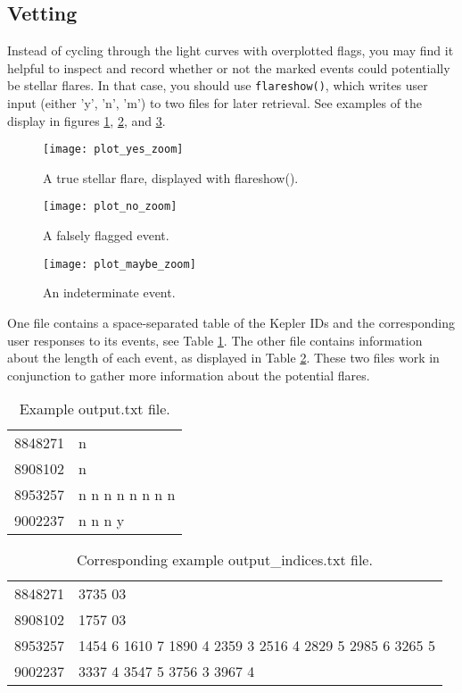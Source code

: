 \documentclass[11pt]{article}
\begin{document}
\subsection{Vetting}
\label{sec:vet}

Instead of cycling through the light curves with overplotted flags,
you may find it helpful to inspect and record whether or not the
marked events could potentially be stellar flares.  In that case, you
should use \verb|flareshow()|, which writes user input (either 'y',
'n', 'm') to two files for later retrieval.  See examples of the
display in figures \ref{fig:yes}, \ref{fig:no}, and \ref{fig:maybe}.
\begin{figure}[h!]
  \caption{A true stellar flare, displayed with flareshow().}
  \label{fig:yes}
  \centering
    \texttt{[image: plot\_yes\_zoom]}
\end{figure}

\begin{figure}[h!]
  \caption{A falsely flagged event.}
  \label{fig:no}
  \centering
    \texttt{[image: plot\_no\_zoom]}
\end{figure}

\begin{figure}[h!]
  \caption{An indeterminate event.}
  \label{fig:maybe}
  \centering
    \texttt{[image: plot\_maybe\_zoom]}
\end{figure}

One file contains a space-separated table of the Kepler IDs and the
corresponding user responses to its events, see Table
\ref{tab:output}.  The other file contains information about the
length of each event, as displayed in Table \ref{tab:outputindices}.
These two files work in conjunction to gather more information about
the potential flares.
\begin{table}[h]
  \centering
  \begin{tabular}{l l}
    8848271 &  n \\
    8908102 &  n \\
    8953257 &  n  n  n  n  n  n  n  n \\
    9002237 &  n  n  n  y \\
  \end{tabular}
\caption{Example output.txt file.}
\label{tab:output}
\end{table}

\begin{table}[!h]
  \centering
  \begin{tabular}{l l}

8848271 &  3735 03 \\
8908102 &  1757 03 \\
8953257 &  1454  6 1610  7 1890  4 2359  3 2516  4 2829  5 2985  6
3265  5 \\
9002237 &  3337  4 3547  5 3756  3 3967  4 \\
\end{tabular}
\caption{Corresponding example output\_indices.txt file.}
\label{tab:outputindices}
\end{table}
\end{document}
